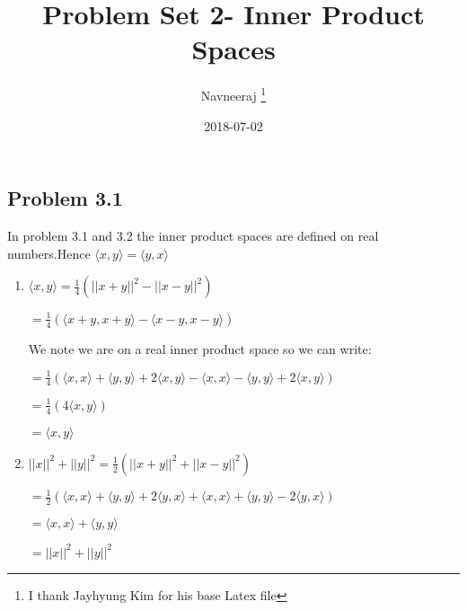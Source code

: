 \documentclass[letterpaper,12pt]{article}
\theoremstyle{definition}
\begin{document}
	
	\title{Problem Set 2- Inner Product Spaces\\
	}
	\author{
		Navneeraj \footnote{I thank Jayhyung Kim for his base Latex file}\\[-2pt]
	}
	\date{2018-07-02}
	\vspace{-9mm}
	\maketitle
	\thispagestyle{empty}
	
	\pagestyle{fancy}
	\fancyhf{}
	\cfoot{\thepage}
	
	\begin{spacing}{1.3}{}
		\vspace{1 mm}

	
\subsection*{Problem 3.1}

	In problem 3.1 and 3.2 the inner product spaces are defined on real numbers.Hence $\langle x, y \rangle = 	\langle y, x \rangle $

\begin{enumerate}
  \item 
	$\langle x, y \rangle = \frac{1}{4}(||x + y||^2 - ||x - y||^2)$
	
	$= \frac{1}{4}(\langle x + y, x + y \rangle - \langle x - y, x - y \rangle)$
	
	We note we are on a real inner product space so we can write:
	
	$= \frac{1}{4}(\langle x, x \rangle + \langle y, y \rangle + 2\langle x, y \rangle - \langle x, x \rangle - \langle y, y \rangle + 2\langle x, y \rangle)$
	
	$= \frac{1}{4}(4\langle x, y \rangle)$
	
	$= \langle x, y \rangle$
  \item 
  	$||x||^2 + ||y||^2 = \frac{1}{2}(||x + y||^2 + ||x - y||^2)$
	
	$= \frac{1}{2}(\langle x, x \rangle + \langle y, y \rangle + 2\langle y, x \rangle + \langle x, x \rangle + \langle y, y \rangle - 2\langle y, x \rangle)$
	
	$= \langle x, x \rangle + \langle y, y \rangle$
	
	$= ||x||^2 + ||y||^2$
	
	\setlength{\leftskip}{0pt}
\end{enumerate}	


\end{spacing}
\end{document}
